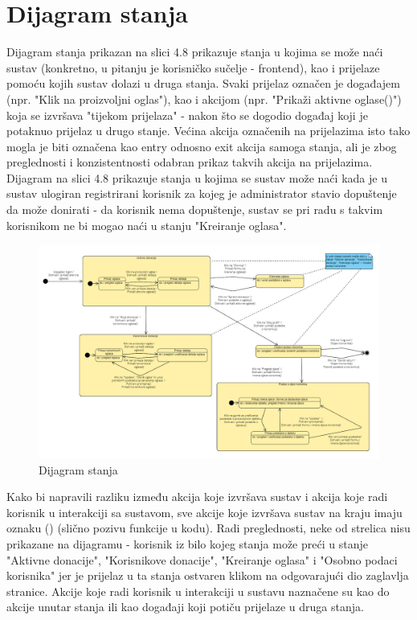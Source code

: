 			\eject
		
		\section{Dijagram stanja}
			
                Dijagram stanja prikazan na slici 4.8 prikazuje stanja u kojima se može naći sustav (konkretno, u pitanju je korisničko sučelje - frontend), kao i prijelaze pomoću kojih sustav dolazi u druga stanja. Svaki prijelaz označen je događajem (npr. "Klik na proizvoljni oglas"), kao i akcijom (npr. "Prikaži aktivne oglase()") koja se izvršava "tijekom prijelaza" - nakon što se dogodio događaj koji je potaknuo prijelaz u drugo stanje. Većina akcija označenih na prijelazima isto tako mogla je biti označena kao entry odnosno exit akcija samoga stanja, ali je zbog preglednosti i konzistentnosti odabran prikaz takvih akcija na prijelazima. Dijagram na slici 4.8 prikazuje stanja u kojima se sustav može naći kada je u sustav ulogiran registrirani korisnik za kojeg je administrator stavio dopuštenje da može donirati - da korisnik nema dopuštenje, sustav se pri radu s takvim korisnikom ne bi mogao naći u stanju "Kreiranje oglasa". \\

                \begin{figure}[H]
				\includegraphics[width=\textwidth,height=0.5\textheight]{dijagrami/Dijagram stanja.png}
				\centering
				\caption{Dijagram stanja}
				\label{fig:StateDiagram}
			\end{figure}
			
			\eject 
                
                Kako bi napravili razliku između akcija koje izvršava sustav i akcija koje radi korisnik u interakciji sa sustavom, sve akcije koje izvršava sustav na kraju imaju oznaku () (slično pozivu funkcije u kodu). Radi preglednosti, neke od strelica nisu prikazane na dijagramu - korisnik iz bilo kojeg stanja može preći u stanje "Aktivne donacije", "Korisnikove donacije", "Kreiranje oglasa" i "Osobno podaci korisnika" jer je prijelaz u ta stanja ostvaren klikom na odgovarajući dio zaglavlja stranice. Akcije koje radi korisnik u interakciji u sustavu naznačene su kao do akcije unutar stanja ili kao događaji koji potiču prijelaze u druga stanja.\\
                                
